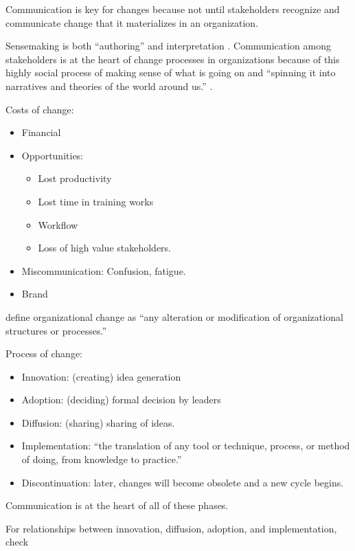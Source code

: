 \documentclass[
]{book}
\providecommand{\tightlist}{%
  \setlength{\itemsep}{0pt}\setlength{\parskip}{0pt}}
\begin{document}
Communication is key for changes because not until stakeholders recognize and communicate change that it materializes in
an organization.

Sensemaking is both ``authoring'' and interpretation \citep{Lewis_2019}. Communication among stakeholders is at the heart of
change processes in organizations because of this highly social process of making sense of what is going on and
``spinning it into narratives and theories of the world around us.'' \citep{Lewis_2019}.

Costs of change:

\begin{itemize}
\item
  Financial
\item
  Opportunities:

  \begin{itemize}
  \tightlist
  \item
    Lost productivity
  \item
    Lost time in training works
  \item
    Workflow
  \item
    Loss of high value stakeholders.
  \end{itemize}
\item
  Miscommunication: Confusion, fatigue.
\item
  Brand
\end{itemize}

\citep[p.10]{Zorn_1999} define organizational change as ``any alteration or modification of organizational structures or
processes.''

Process of change:

\begin{itemize}
\tightlist
\item
  Innovation: (creating) idea generation
\item
  Adoption: (deciding) formal decision by leaders
\item
  Diffusion: (sharing) sharing of ideas.
\item
  Implementation: ``the translation of any tool or technique, process, or method of doing, from knowledge to practice.''
  \citep{Tornatzky_1982}
\item
  Discontinuation: later, changes will become obsolete and a new cycle begins.
\end{itemize}

Communication is at the heart of all of these phases.

For relationships between innovation, diffusion, adoption, and implementation, check \citep[pp.~35]{Lewis_2019}
\end{document}
